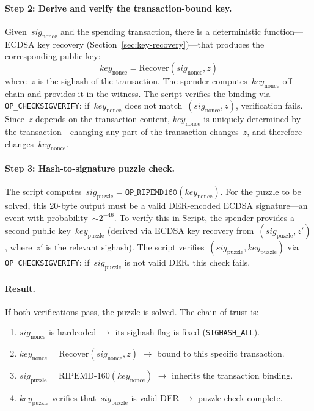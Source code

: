 \documentclass[11pt, a4paper]{article}
\begin{document}
\paragraph{Step 2: Derive and verify the transaction-bound key.}
Given~$\mathit{sig}_{\mathrm{nonce}}$ and the spending transaction, there is a deterministic function---ECDSA key recovery (Section~\ref{sec:key-recovery})---that produces the corresponding public key:
$$\mathit{key}_{\mathrm{nonce}} = \text{Recover}(\mathit{sig}_{\mathrm{nonce}}, z)$$
where~$z$ is the sighash of the transaction. The spender computes~$\mathit{key}_{\mathrm{nonce}}$ off-chain and provides it in the witness. The script verifies the binding via \texttt{OP\_CHECKSIGVERIFY}: if~$\mathit{key}_{\mathrm{nonce}}$ does not match~$(\mathit{sig}_{\mathrm{nonce}}, z)$, verification fails. Since~$z$ depends on the transaction content, $\mathit{key}_{\mathrm{nonce}}$ is uniquely determined by the transaction---changing any part of the transaction changes~$z$, and therefore changes~$\mathit{key}_{\mathrm{nonce}}$.

\paragraph{Step 3: Hash-to-signature puzzle check.}
The script computes~$\mathit{sig}_{\mathrm{puzzle}} = \texttt{OP\_RIPEMD160}(\mathit{key}_{\mathrm{nonce}})$. For the puzzle to be solved, this 20-byte output must be a valid DER-encoded ECDSA signature---an event with probability~${\sim}2^{-46}$. To verify this in Script, the spender provides a second public key~$\mathit{key}_{\mathrm{puzzle}}$ (derived via ECDSA key recovery from~$(\mathit{sig}_{\mathrm{puzzle}}, z')$, where~$z'$ is the relevant sighash). The script verifies~$(\mathit{sig}_{\mathrm{puzzle}}, \mathit{key}_{\mathrm{puzzle}})$ via \texttt{OP\_CHECKSIGVERIFY}: if~$\mathit{sig}_{\mathrm{puzzle}}$ is not valid DER, this check fails.

\paragraph{Result.}
If both verifications pass, the puzzle is solved. The chain of trust is:
\begin{enumerate}
    \item $\mathit{sig}_{\mathrm{nonce}}$ is hardcoded $\to$ its sighash flag is fixed (\texttt{SIGHASH\_ALL}).
    \item $\mathit{key}_{\mathrm{nonce}} = \text{Recover}(\mathit{sig}_{\mathrm{nonce}}, z)$ $\to$ bound to this specific transaction.
    \item $\mathit{sig}_{\mathrm{puzzle}} = \text{RIPEMD-160}(\mathit{key}_{\mathrm{nonce}})$ $\to$ inherits the transaction binding.
    \item $\mathit{key}_{\mathrm{puzzle}}$ verifies that~$\mathit{sig}_{\mathrm{puzzle}}$ is valid DER $\to$ puzzle check complete.
\end{enumerate}
\end{document}
